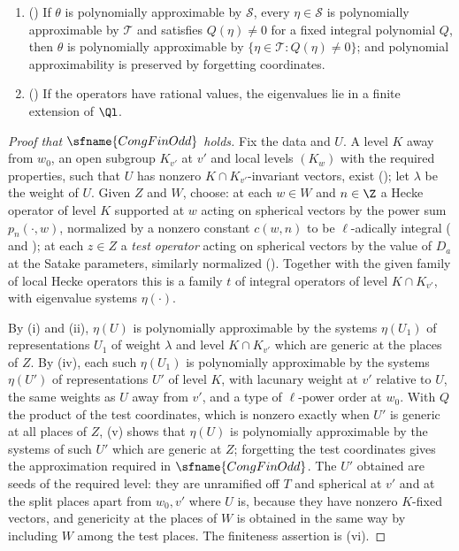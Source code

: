 \begin{enumerate}[label=(\roman*),nosep]
  type of $\ell$-power order at $w_0$ ().
\item () If $\theta$ is polynomially approximable
  by $\mathcal S$, every $\eta\in\mathcal S$ is polynomially approximable by $\mathcal T$ and satisfies $Q(\eta)\ne0$ for a
  fixed integral polynomial $Q$, then $\theta$ is polynomially approximable by $\{\eta\in\mathcal T:Q(\eta)\ne0\}$; and
  polynomial approximability is preserved by forgetting coordinates.
\item () If the operators have rational values, the eigenvalues lie in a finite
  extension of $\Ql$.
\end{enumerate}

\begin{proof}[Proof that $\sfname{CongFinOdd}$ holds]
Fix the data and $U$. A level $K$ away from $w_0$, an open subgroup $K_{v'}$ at $v'$ and local levels $(K_w)$ with the
required properties, such that $U$ has nonzero $K\cap K_{v'}$-invariant vectors, exist
(); let $\lambda$ be the weight of $U$. Given $Z$ and $W$, choose: at each
$w\in W$ and $n\in\Z$ a Hecke operator of level $K$ supported at $w$ acting on spherical vectors by the power sum
$p_n(\cdot,w)$, normalized by a nonzero constant $c(w,n)$ to be $\ell$-adically integral
( and ); at each $z\in Z$ a
\emph{test operator} acting on spherical vectors by the value of $D_a$ at the Satake parameters, similarly normalized
(). Together with the given family of local Hecke operators this is a
family $t$ of integral operators of level $K\cap K_{v'}$, with eigenvalue systems $\eta(\cdot)$.

By (i) and (ii), $\eta(U)$ is polynomially approximable by the systems $\eta(U_1)$ of representations $U_1$ of weight
$\lambda$ and level $K\cap K_{v'}$ which are generic at the places of $Z$. By (iv), each such $\eta(U_1)$ is polynomially
approximable by the systems $\eta(U')$ of representations $U'$ of level $K$, with lacunary weight at $v'$ relative to
$U$, the same weights as $U$ away from $v'$, and a type of $\ell$-power order at $w_0$. With $Q$ the product of the test
coordinates, which is nonzero exactly when $U'$ is generic at all places of $Z$, (v) shows that $\eta(U)$ is polynomially
approximable by the systems of such $U'$ which are generic at $Z$; forgetting the test coordinates gives the
approximation required in $\sfname{CongFinOdd}$. The $U'$ obtained are seeds of the required level: they are unramified
off $T$ and spherical at $v'$ and at the split places apart from $w_0,v'$ where $U$ is, because they have nonzero
$K$-fixed vectors, and genericity at the places of $W$ is obtained in the same way by including $W$ among the test
places. The finiteness assertion is (vi).
\end{proof}

